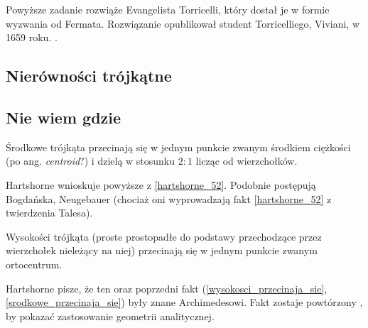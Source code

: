 
Powyższe zadanie rozwiąże Evangelista Torricelli, który dostał je w formie wyzwania od Fermata.
%
Rozwiązanie opublikował student Torricelliego, Viviani, w 1659 roku.
. %


\subsection{Nierówności trójkątne}


\subsection{Nie wiem gdzie}

\begin{proposition}
	\label{srodkowe_przecinaja_sie}
	Środkowe trójkąta przecinają się w jednym punkcie zwanym środkiem ciężkości (po ang. \emph{centroid}?) i dzielą w stosunku $2 : 1$ licząc od wierzchołków.
\end{proposition}

Hartshorne \cite[s. 53, 54]{hartshorne2000} wnioskuje powyższe z \ref{hartshorne_52}.
Podobnie postępują Bogdańska, Neugebauer (chociaż oni wyprowadzają fakt \ref{hartshorne_52} z twierdzenia Talesa).
%

\begin{proposition}
	\label{wysokosci_przecinaja_sie}
	Wysokości trójkąta (proste prostopadłe do podstawy przechodzące przez wierzchołek nieleżący na niej) przecinają się w jednym punkcie zwanym ortocentrum.
\end{proposition}

Hartshorne \cite[s. 52, 54]{hartshorne2000} pisze, że ten oraz poprzedni fakt (\ref{wysokosci_przecinaja_sie}, \ref{srodkowe_przecinaja_sie}) były znane Archimedesowi.
Fakt zostaje powtórzony \cite[s. 119-120]{hartshorne2000}, by pokazać zastosowanie geometrii analitycznej.

